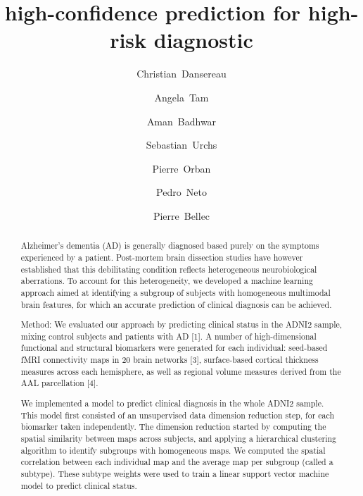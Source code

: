 \documentclass[authoryear]{elsarticle}
\begin{document}
\begin{frontmatter}

\title{high-confidence prediction for high-risk diagnostic}

\author[a,b]{Christian~Dansereau}
\author[c]{Angela~Tam}
\author[a,b]{Aman~Badhwar}
\author[c]{Sebastian~Urchs}
\author[a]{Pierre~Orban}
\author[a]{Pedro~Neto}
\author[a,b]{Pierre~Bellec}
\address[a]{Centre de Recherche de l'Institut Universitaire de G\'eriatrie de Montr\'eal, Montr\'eal, CA}
\address[b]{D\'epartement d'Informatique et de recherche op\'erationnelle, Universit\'e de Montr\'eal, Montr\'eal,CA}
\address[c]{Integrated Program in Neuroscience, McGill University, Montr\'eal,CA}
%

\begin{abstract}
Alzheimer’s dementia (AD) is generally diagnosed based purely on the symptoms experienced by a patient. Post-mortem brain dissection studies have however established that this debilitating condition reflects heterogeneous neurobiological aberrations. To account for this heterogeneity, we developed a machine learning approach aimed at identifying a subgroup of subjects with homogeneous multimodal brain features, for which an accurate prediction of clinical diagnosis can be achieved. 

Method: 
We evaluated our approach by predicting clinical status in the ADNI2 sample, mixing control subjects and patients with AD [1]. A number of high-dimensional functional and structural biomarkers were generated for each individual: seed-based fMRI connectivity maps in 20 brain networks [3], surface-based cortical thickness measures across each hemisphere, as well as regional volume measures derived from the AAL parcellation [4]. 

We implemented a model to predict clinical diagnosis in the whole ADNI2 sample. This model first consisted of an unsupervised data dimension reduction step, for each biomarker taken independently. The dimension reduction started by computing the spatial similarity between maps across subjects, and applying a hierarchical clustering algorithm to identify subgroups with homogeneous maps. We computed the spatial correlation between each individual map and the average map per subgroup (called a subtype). These subtype weights were used to train a linear support vector machine model to predict clinical status. 


\end{abstract}
\end{frontmatter}
\end{document}
